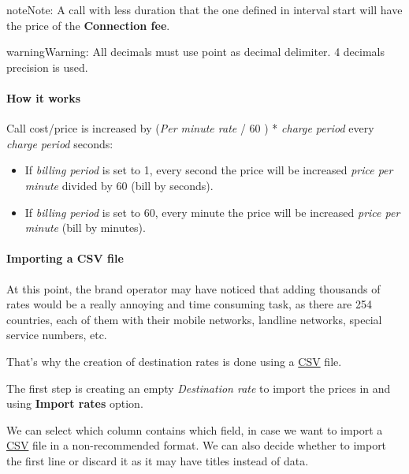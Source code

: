 \documentclass[letterpaper,10pt,english]{sphinxmanual}
\begin{document}
\begin{notice}{note}{Note:}
A call with less duration that the one defined in interval start will have the price of the \textbf{Connection fee}.
\end{notice}

\begin{notice}{warning}{Warning:}
All decimals must use point as decimal delimiter. 4 decimals precision is used.
\end{notice}
\paragraph{How it works}

Call cost/price is increased by (\emph{Per minute rate} / 60 ) * \emph{charge period} every \emph{charge period} seconds:
\begin{itemize}
\item {} 
If \emph{billing period} is set to 1, every second the price will be increased
\emph{price per minute} divided by 60 (bill by seconds).

\item {} 
If \emph{billing period} is set to 60, every minute the price will be increased
\emph{price per minute} (bill by minutes).

\end{itemize}


\paragraph{Importing a CSV file}
\label{administration_portal/brand/billing/destination_rates:importing-a-csv-file}\label{administration_portal/brand/billing/destination_rates:id3}
At this point, the brand operator may have noticed that adding thousands
of rates would be a really annoying and time consuming task, as there
are 254 countries, each of them with their mobile networks, landline networks,
special service numbers, etc.

That's why the creation of destination rates is done using a
\href{https://es.wikipedia.org/wiki/CSV}{CSV} file.

The first step is creating an empty \emph{Destination rate} to import the prices in and using \textbf{Import rates} option.

We can select which column contains which field, in case we want to import a
\href{https://es.wikipedia.org/wiki/CSV}{CSV} file in a non-recommended format. We
can also decide whether to import the first line or discard it as it may have
titles instead of data.
\end{document}
